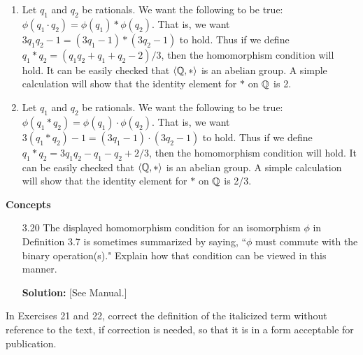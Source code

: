 \begin{enumerate}
      \begin{enumerate}
         \item Let $q_1$ and $q_2$ be rationals. We want the following to be
               true: $\phi(q_1 \cdot q_2) = \phi(q_1) * \phi(q_2)$. That is, we 
               want $3q_1q_2 - 1 = (3q_1 - 1) * (3q_2 - 1)$ to hold. Thus if we 
               define $q_1 * q_2 = (q_1q_2 + q_1 + q_2 - 2)/3$, then the 
               homomorphism condition will hold. It can be easily checked that
               $\langle \mathbb{Q}, * \rangle$ is an abelian group. A simple calculation will show
               that the identity element for $*$ on $\mathbb{Q}$ is 2.
         \item Let $q_1$ and $q_2$ be rationals. We want the following to be
               true: $\phi(q_1 * q_2) = \phi(q_1) \cdot \phi(q_2)$. That is, we 
               want $3(q_1 * q_2) - 1 = (3q_1 - 1) \cdot (3q_2 - 1)$ to hold. 
               Thus if we define $q_1 * q_2 = 3q_1q_2 - q_1 - q_2 + 2/3$, then 
               the homomorphism condition will hold. It can be easily checked 
               that $\langle \mathbb{Q}, * \rangle$ is an abelian group. A simple calculation will
               show that the identity element for $*$ on $\mathbb{Q}$ is 2/3.
      \end{enumerate}
\end{enumerate}

\noindent \textbf{Concepts}

\begin{enumerate}
   \item[3.20] The displayed homomorphism condition for an isomorphism $\phi$ in
               Definition 3.7 is sometimes summarized by saying, ``$\phi$ must
               commute with the binary operation(s)." Explain how that condition
               can be viewed in this manner.

      \textbf{Solution:} [See Manual.]
\end{enumerate}

\noindent In Exercises 21 and 22, correct the definition of the italicized term
          without reference to the text, if correction is needed, so that it is
          in a form acceptable for publication.

